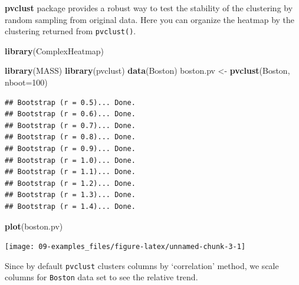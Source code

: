 \documentclass[]{book}
\newenvironment{Shaded}{\begin{snugshade}}{\end{snugshade}}
\newcommand{\KeywordTok}[1]{\textcolor[rgb]{0.13,0.29,0.53}{\textbf{#1}}}
\newcommand{\DataTypeTok}[1]{\textcolor[rgb]{0.13,0.29,0.53}{#1}}
\newcommand{\DecValTok}[1]{\textcolor[rgb]{0.00,0.00,0.81}{#1}}
\newcommand{\StringTok}[1]{\textcolor[rgb]{0.31,0.60,0.02}{#1}}
\newcommand{\OperatorTok}[1]{\textcolor[rgb]{0.81,0.36,0.00}{\textbf{#1}}}
\newcommand{\NormalTok}[1]{#1}
\theoremstyle{definition}
\theoremstyle{definition}
\theoremstyle{definition}
\theoremstyle{remark}
\begin{document}
\textbf{pvclust} package provides a robust way to test the stability of
the clustering by random sampling from original data. Here you can
organize the heatmap by the clustering returned from \texttt{pvclust()}.

\begin{Shaded}
\begin{Highlighting}[]
\KeywordTok{library}\NormalTok{(ComplexHeatmap)}

\KeywordTok{library}\NormalTok{(MASS)}
\KeywordTok{library}\NormalTok{(pvclust)}
\KeywordTok{data}\NormalTok{(Boston)}
\NormalTok{boston.pv <-}\StringTok{ }\KeywordTok{pvclust}\NormalTok{(Boston, }\DataTypeTok{nboot=}\DecValTok{100}\NormalTok{)}
\end{Highlighting}
\end{Shaded}

\begin{verbatim}
## Bootstrap (r = 0.5)... Done.
## Bootstrap (r = 0.6)... Done.
## Bootstrap (r = 0.7)... Done.
## Bootstrap (r = 0.8)... Done.
## Bootstrap (r = 0.9)... Done.
## Bootstrap (r = 1.0)... Done.
## Bootstrap (r = 1.1)... Done.
## Bootstrap (r = 1.2)... Done.
## Bootstrap (r = 1.3)... Done.
## Bootstrap (r = 1.4)... Done.
\end{verbatim}

\begin{Shaded}
\begin{Highlighting}[]
\KeywordTok{plot}\NormalTok{(boston.pv)}
\end{Highlighting}
\end{Shaded}

\begin{center}\texttt{[image: 09-examples\_files/figure-latex/unnamed-chunk-3-1]} \end{center}

Since by default \texttt{pvclust} clusters columns by `correlation'
method, we scale columns for \texttt{Boston} data set to see the
relative trend.

\begin{Shaded}
\end{Shaded}
\end{document}

